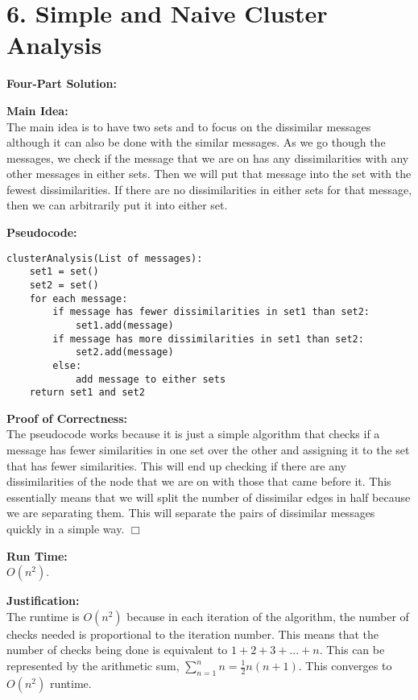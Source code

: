 \documentclass[11pt]{article}
\def\endproofmark{$\Box$}
\newenvironment{FourPartSolution}{\par{\bf Four-Part Solution:}}{\smallskip}
\newenvironment{mainIdea}{\par{\bf Main Idea:}}{\smallskip}
\newenvironment{pseudocode}{\par{\bf Pseudocode:}}{\smallskip}
\newenvironment{proofOfCorrectness}{\par{\bf Proof of Correctness:}}{\endproofmark\smallskip}
\newenvironment{runTime}{\par{\bf Run Time:}}{\smallskip}
\newenvironment{justification}{\par{\bf Justification:}}{\smallskip}
\begin{document}
\newpage
\section*{6. Simple and Naive Cluster Analysis}
\begin{FourPartSolution}
\\
\begin{mainIdea}
\\
The main idea is to have two sets and to focus on the dissimilar messages although it can also be done with the similar messages. As we go though the messages, we check if the message that we are on has any dissimilarities with any other messages in either sets. Then we will put that message into the set with the fewest dissimilarities. If there are no dissimilarities in either sets for that message, then we can arbitrarily put it into either set.
\end{mainIdea}
\\
\begin{pseudocode}
\begin{lstlisting}
clusterAnalysis(List of messages):
	set1 = set()
	set2 = set()
	for each message:
		if message has fewer dissimilarities in set1 than set2:
			set1.add(message)
		if message has more dissimilarities in set1 than set2:
			set2.add(message)
		else:
			add message to either sets
	return set1 and set2
\end{lstlisting}
\end{pseudocode}
\begin{proofOfCorrectness}
\\
The pseudocode works because it is just a simple algorithm that checks if a message has fewer similarities in one set over the other and assigning it to the set that has fewer similarities. This will end up checking if there are any dissimilarities of the node that we are on with those that came before it. This essentially means that we will split the number of dissimilar edges in half because we are separating them. This will separate the pairs of dissimilar messages quickly in a simple way.
\end{proofOfCorrectness}
\\
\begin{runTime}
\\
$O(n ^ 2)$.
\end{runTime}
\\
\begin{justification}
\\
The runtime is $O(n ^ 2)$ because in each iteration of the algorithm, the number of checks needed is proportional to the iteration number. This means that the number of checks being done is equivalent to $1 + 2 + 3 + ... + n$. This can be represented by the arithmetic sum, $\sum_{n = 1}^{n} n = \frac{1} {2} n (n + 1)$. This converges to $O(n ^ 2)$ runtime.
\end{justification}
\end{FourPartSolution}
\end{document}
